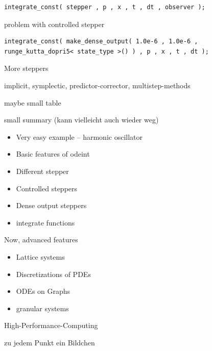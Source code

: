 \begin{frame}[fragile]

\begin{lstlisting}
integrate_const( stepper , p , x , t , dt , observer );
\end{lstlisting}

problem with controlled stepper

\begin{lstlisting}
integrate_const( make_dense_output( 1.0e-6 , 1.0e-6 , runge_kutta_dopri5< state_type >() ) , p , x , t , dt );
\end{lstlisting}


\end{frame}




\begin{frame}
 More steppers

 implicit, symplectic, predictor-corrector, multistep-methods

 maybe small table
\end{frame}




\begin{frame}
 small summary (kann vielleicht auch wieder weg)
 \begin{itemize}
  \item Very easy example -- harmonic oscillator
  \item Basic features of odeint
  \item Different stepper
  \item Controlled steppers
  \item Dense output steppers
  \item integrate functions
 \end{itemize}

 Now, advanced features

\end{frame}



\begin{frame}

 \begin{itemize}
  \item<1->Lattice systems
  \item<2->Discretizations of PDEs
  \item<3->ODEs on Graphs
  \item<4->granular systems
 \end{itemize}

 High-Performance-Computing

 zu jedem Punkt ein Bildchen
 
\end{frame}



